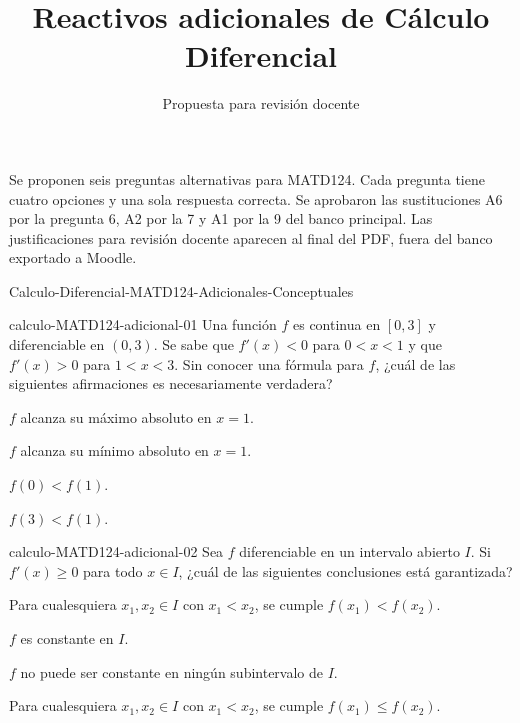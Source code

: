 \documentclass[10pt]{article}
\title{Reactivos adicionales de Cálculo Diferencial}
\author{Propuesta para revisión docente}
\date{}
\begin{document}
\maketitle
Se proponen seis preguntas alternativas para MATD124. Cada pregunta tiene
cuatro opciones y una sola respuesta correcta. Se aprobaron las sustituciones
A6 por la pregunta 6, A2 por la 7 y A1 por la 9 del banco principal.
Las justificaciones para revisión
docente aparecen al final del PDF, fuera del banco exportado a Moodle.

\begin{quiz}{Calculo-Diferencial-MATD124-Adicionales-Conceptuales}

\begin{multi}[single=true,shuffle=false]{calculo-MATD124-adicional-01}
Una función $f$ es continua en $[0,3]$ y diferenciable en $(0,3)$.
Se sabe que $f'(x)<0$ para $0<x<1$ y que $f'(x)>0$ para $1<x<3$.
Sin conocer una fórmula para $f$, ¿cuál de las siguientes afirmaciones
es necesariamente verdadera?
    \item[fraction=0] $f$ alcanza su máximo absoluto en $x=1$.
    \item* $f$ alcanza su mínimo absoluto en $x=1$.
    \item[fraction=0] $f(0)<f(1)$.
    \item[fraction=0] $f(3)<f(1)$.
\end{multi}

\begin{multi}[single=true,shuffle=false]{calculo-MATD124-adicional-02}
Sea $f$ diferenciable en un intervalo abierto $I$. Si $f'(x)\geq0$
para todo $x\in I$, ¿cuál de las siguientes conclusiones está garantizada?
    \item[fraction=0] Para cualesquiera $x_1,x_2\in I$ con $x_1<x_2$,
    se cumple $f(x_1)<f(x_2)$.
    \item[fraction=0] $f$ es constante en $I$.
    \item[fraction=0] $f$ no puede ser constante en ningún subintervalo de $I$.
    \item* Para cualesquiera $x_1,x_2\in I$ con $x_1<x_2$,
    se cumple $f(x_1)\leq f(x_2)$.
\end{multi}


\end{quiz}
\end{document}
